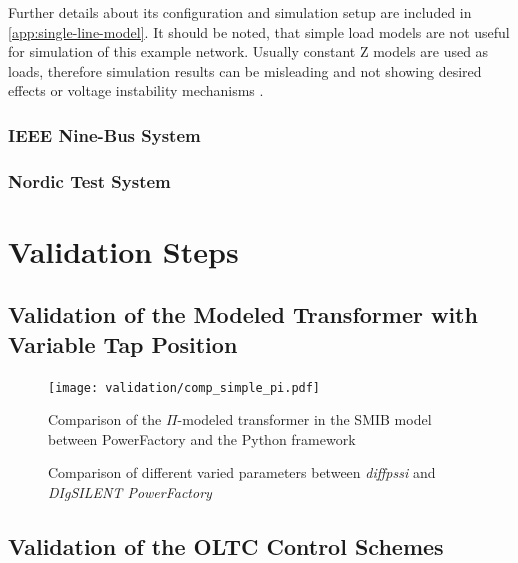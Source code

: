 Further details about its configuration and simulation setup are included in \autoref{app:single-line-model}. 
It should be noted, that simple load models are not useful for simulation of this example network. 
Usually constant Z models are used as loads, therefore simulation results can be misleading and not showing desired effects or voltage instability mechanisms \quelle. 

\subsubsection{IEEE Nine-Bus System}

\subsubsection{Nordic Test System}

\section{Validation Steps}

\subsection{Validation of the Modeled Transformer with Variable Tap Position}

\begin{figure}[htbp!]
    \centering
    \texttt{[image: validation/comp\_simple\_pi.pdf]}
    \caption{Comparison of the $\Pi$-modeled transformer in the \acs{SMIB} model between PowerFactory and the Python framework}
    \label{fig:comp-simple-pi}
\end{figure}

\begin{figure}[htbp!]
    \centering
    \caption{Comparison of different varied parameters between \textit{diffpssi} and \textit{DIgSILENT PowerFactory}}
    \label{fig:validation-params-pi-trafo}
\end{figure}

\subsection{Validation of the OLTC Control Schemes}

